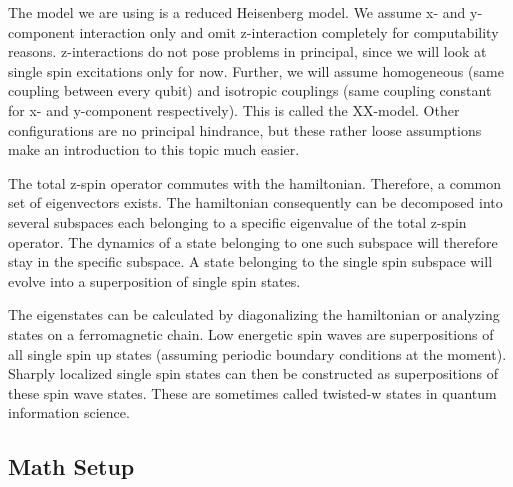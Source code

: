 \noindent The model we are using is a reduced Heisenberg model. We assume x- and y-component interaction only and omit z-interaction completely for computability reasons. z-interactions do not pose problems in principal, since we will look at single spin excitations only for now. Further, we will assume homogeneous (same coupling between every qubit) and isotropic couplings (same coupling constant for x- and y-component respectively). This is called the XX-model. Other configurations are no principal hindrance, but these rather loose assumptions make an introduction to this topic much easier.\par
The total z-spin operator commutes with the hamiltonian. Therefore, a common set of eigenvectors exists. The hamiltonian consequently can be decomposed into several subspaces each belonging to a specific eigenvalue of the total z-spin operator. The dynamics of a state belonging to one such subspace will therefore stay in the specific subspace. A state belonging to the single spin subspace will evolve into a superposition of single spin states.\par
The eigenstates can be calculated by diagonalizing the hamiltonian or analyzing states on a ferromagnetic chain\cite{Stolze2014}. Low energetic spin waves are superpositions of all single spin up states (assuming periodic boundary conditions at the moment). Sharply localized single spin states can then be constructed as superpositions of these spin wave states. These are sometimes called twisted-w states in quantum information science\cite{Osborne2004}. 

\subsection{Math Setup}

